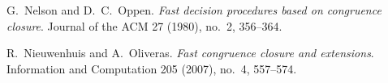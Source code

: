 
G.~Nelson and D.~C.~Oppen.
\emph{Fast decision procedures based on congruence closure}.
Journal of the ACM 27 (1980), no.~2, 356--364.

R.~Nieuwenhuis and A.~Oliveras.
\emph{Fast congruence closure and extensions}.
Information and Computation 205 (2007), no.~4, 557--574.
